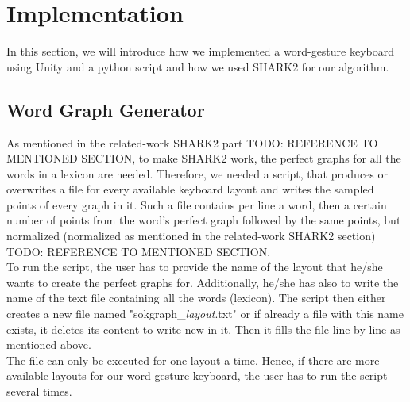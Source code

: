 \chapter{Implementation}

In this section, we will introduce how we implemented a word-gesture keyboard using Unity and a python script and how we used SHARK2 for our algorithm.

\section{Word Graph Generator}
As mentioned in the related-work SHARK2 part TODO: REFERENCE TO MENTIONED SECTION, to make SHARK2 work, the perfect graphs for all the words in a lexicon are needed. Therefore, we needed a script, that produces or overwrites a file for every available keyboard layout and writes the sampled points of every graph in it. Such a file contains per line a word, then a certain number of points from the word's perfect graph followed by the same points, but normalized (normalized as mentioned in the related-work SHARK2 section) TODO: REFERENCE TO MENTIONED SECTION.\\
To run the script, the user has to provide the name of the layout that he/she wants to create the perfect graphs for. Additionally, he/she has also to write the name of the text file containing all the words (lexicon). The script then either creates a new file named "sokgraph\_\textit{layout}.txt" or if already a file with this name exists, it deletes its content to write new in it. Then it fills the file line by line as mentioned above.\\
The file can only be executed for one layout a time. Hence, if there are more available layouts for our word-gesture keyboard, the user has to run the script several times.

